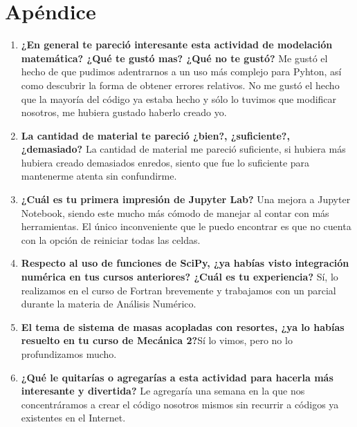 \documentclass{article}
\begin{document}
\section{Apéndice}
\begin{enumerate}
\item \textbf{¿En general te pareció interesante esta actividad de modelación matemática? ¿Qué te gustó mas? ¿Qué no te gustó?} Me gustó el hecho de que pudimos adentrarnos a un uso más complejo para Pyhton, así como descubrir la forma de obtener errores relativos. No me gustó el hecho que la mayoría del código ya estaba hecho y sólo lo tuvimos que modificar nosotros, me hubiera gustado haberlo creado yo.

\item \textbf{La cantidad de material te pareció ¿bien?, ¿suficiente?, ¿demasiado?} La cantidad de material me pareció suficiente, si hubiera más hubiera creado demasiados enredos, siento que fue lo suficiente para mantenerme atenta sin confundirme.

\item \textbf{¿Cuál es tu primera impresión de Jupyter Lab?} Una mejora a Jupyter Notebook, siendo este mucho más cómodo de manejar al contar con más herramientas. El único inconveniente que le puedo encontrar es que no cuenta con la opción de reiniciar todas las celdas. 

\item \textbf{Respecto al uso de funciones de SciPy, ¿ya habías visto integración numérica en tus cursos anteriores? ¿Cuál es tu experiencia?} Sí, lo realizamos en el curso de Fortran brevemente y trabajamos con un parcial durante la materia de Análisis Numérico.

\item \textbf{El tema de sistema de masas acopladas con resortes, ¿ya lo habías resuelto en tu curso de Mecánica 2?}Sí lo vimos, pero no lo profundizamos mucho.

\item \textbf{¿Qué le quitarías o agregarías a esta actividad para hacerla más interesante y divertida?} Le agregaría una semana en la que nos concentráramos a crear el código nosotros mismos sin recurrir a códigos ya existentes en el Internet.

\end{enumerate}
\end{document}
